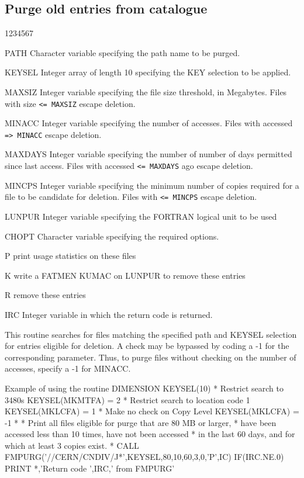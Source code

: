\subsection{Purge old entries from catalogue}
\begin{DLtt}{1234567}
\item[PATH]
Character variable specifying the path name to be purged.
\item[KEYSEL]
Integer array of length 10 specifying the KEY selection to be
applied.
\item[MAXSIZ]
Integer variable specifying the file size threshold, in Megabytes.
Files with size {\tt <= MAXSIZ} escape deletion.
\item[MINACC]
Integer variable specifying the number of accesses.
Files with accessed {\tt => MINACC} escape deletion.
\item[MAXDAYS]
Integer variable specifying the number of number of days permitted
since last access.
Files with accessed {\tt <= MAXDAYS} ago escape deletion.
\item[MINCPS]
Integer variable specifying the minimum number of copies required
for a file to be candidate for deletion.
Files with {\tt <= MINCPS} escape deletion.
\item[LUNPUR]
Integer variable specifying the FORTRAN logical unit to be used
\item[CHOPT]
Character variable specifying the required options.
\begin{DLtt}{12}
\item[P]print usage statistics on these files
\item[K]write a FATMEN KUMAC on LUNPUR to remove these entries
\item[R]remove these entries
\end{DLtt}
\item[IRC]
Integer variable in which the return code is returned.
\end{DLtt}
\par
This routine searches for files matching the specified path
and KEYSEL selection for entries eligible for deletion.
A check may be bypassed by coding a -1 for the corresponding
parameter. Thus, to purge files without checking on the number
of accesses, specify a -1 for MINACC.
\begin{XMPt}{Example of using the routine \protect{}}
      DIMENSION KEYSEL(10)
*     Restrict search to 3480s
      KEYSEL(MKMTFA) = 2
*     Restrict search to location code 1
      KEYSEL(MKLCFA) = 1
*     Make no check on Copy Level
      KEYSEL(MKLCFA) = -1
*
*     Print all files eligible for purge that are 80 MB or larger,
*     have been accessed less than 10 times, have not been accessed
*     in the last 60 days, and for which at least 3 copies exist.
*
      CALL FMPURG('//CERN/CNDIV/J*',KEYSEL,80,10,60,3,0,'P',IC)
      IF(IRC.NE.0) PRINT *,'Return code ',IRC,' from FMPURG'
\end{XMPt}
 
